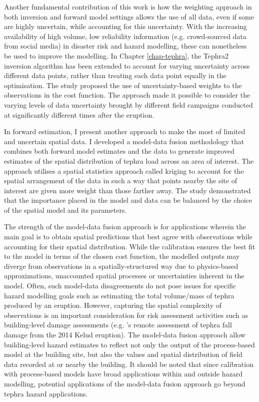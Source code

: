 Another fundamental contribution of this work is how the weighting approach in both inversion and forward model settings allows the use of all data, even if some are highly uncertain, while accounting for this uncertainty. With the increasing availability of high volume, low reliability information (e.g. crowd-sourced data from social media) in disaster risk and hazard modelling, these can nonetheless be used to improve the modelling. In Chapter \ref{chap-tephra}, the Tephra2 inversion algorithm has been extended to account for varying uncertainty across different data points, rather than treating each data point equally in the optimisation. The study proposed the use of uncertainty-based weights to the observations in the cost function. The approach made it possible to consider the varying levels of data uncertainty brought by different field campaigns conducted at significantly different times after the eruption. 

In forward estimation, I present another approach to make the most of limited and uncertain spatial data. I developed a model-data fusion methodology that combines both forward model estimates and the data to generate improved estimates of the spatial distribution of tephra load across an area of interest. The approach utilises a spatial statistics approach called kriging to account for the spatial arrangement of the data in such a way that points nearby the site of interest are given more weight than those farther away. The study demonstrated that the importance placed in the model and data can be balanced by the choice of the spatial model and its parameters. 

The strength of the model-data fusion approach is for applications wherein the main goal is to obtain spatial predictions that best agree with observations while accounting for their spatial distribution. While the calibration ensures the best fit to the model in terms of the chosen cost function, the modelled outputs may diverge from observations in a spatially-structured way due to physics-based approximations, unaccounted spatial processes or uncertainties inherent in the model. Often, such model-data disagreements do not pose issues for specific hazard modelling goals such as estimating the total volume/mass of tephra produced by an eruption. However, capturing the spatial complexity of observations is an important consideration for risk assessment activities such as building-level damage assessments (e.g. \citet{williams2020}'s remote assessment of tephra fall damage from the 2014 Kelud eruption). The model-data fusion approach allow building-level hazard estimates to reflect not only the output of the process-based model at the building site, but also the values and spatial distribution of field data recorded at or nearby the building. It should be noted that since calibration with process-based models have broad applications within and outside hazard modelling, potential applications of the model-data fusion approach go beyond tephra hazard applications.

